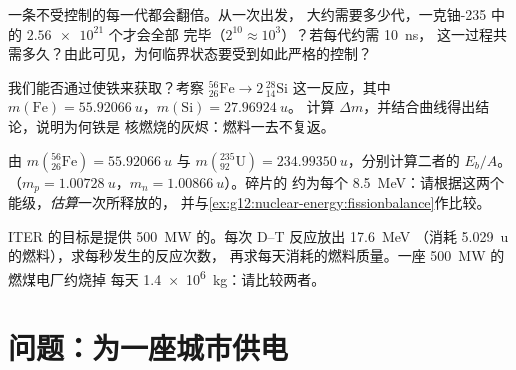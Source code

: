 \begin{exercise}[$\star\star\star$]\label{exo:g12:nuclear-energy:12}
一条不受控制的每一代都会翻倍。从一次出发，
大约需要多少代，一克铀-235 中的 $\num{2.56e21}$ 个才会全部
完毕（$2^{10} \approx 10^{3}$）？若每代约需 \qty{10}{ns}，
这一过程共需多久？由此可见，为何临界状态要受到如此严格的控制？
\end{exercise}

\begin{exercise}[$\star\star\star$]\label{exo:g12:nuclear-energy:13}
我们能否通过使铁来获取？考察
${}^{56}_{26}\mathrm{Fe} \to 2\,{}^{28}_{14}\mathrm{Si}$ 这一反应，其中
$m(\mathrm{Fe}) = \qty{55.92066}{u}$，$m(\mathrm{Si}) = \qty{27.96924}{u}$。
计算 $\Delta m$，并结合曲线得出结论，说明为何铁是
核燃烧的灰烬：燃料一去不复返。
\end{exercise}

\begin{exercise}[$\star\star\star$]\label{exo:g12:nuclear-energy:14}
由 $m({}^{56}_{26}\mathrm{Fe}) = \qty{55.92066}{u}$ 与
$m({}^{235}_{92}\mathrm{U}) = \qty{234.99350}{u}$，分别计算二者的 $E_b/A$。
（$m_p = \qty{1.00728}{u}$，$m_n = \qty{1.00866}{u}$）。碎片的
约为每个 \qty{8.5}{MeV}：请根据这两个能级，\emph{估算}一次所释放的，
并与\cref{ex:g12:nuclear-energy:fissionbalance}作比较。
\end{exercise}

\begin{exercise}[$\star\star\star$]\label{exo:g12:nuclear-energy:15}
ITER 的目标是提供 \qty{500}{MW} 的。每次 D--T 反应放出 \qty{17.6}{MeV}
（消耗 \qty{5.029}{u} 的燃料），求每秒发生的反应次数，
再求每天消耗的燃料质量。一座 \qty{500}{MW} 的燃煤电厂约烧掉
每天 \qty{1.4e6}{kg}：请比较两者。
\end{exercise}

\section{问题：为一座城市供电}

